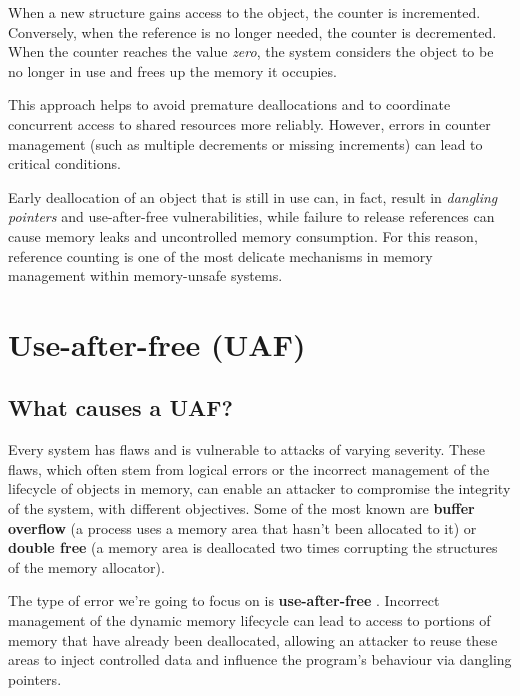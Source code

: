 \noindent When a new structure gains access to the object, the counter is incremented. Conversely, when the reference is no longer needed, the counter is decremented. When the counter reaches the value \textit{zero}, the system considers the object to be no longer in use and frees up the memory it occupies.

This approach helps to avoid premature deallocations and to coordinate concurrent access to shared resources more reliably. However, errors in counter management (such as multiple decrements or missing increments) can lead to critical conditions.

Early deallocation of an object that is still in use can, in fact, result in \textit{dangling pointers} and use-after-free vulnerabilities, while failure to release references can cause memory leaks and uncontrolled memory consumption. For this reason, reference counting is one of the most delicate mechanisms in memory management within memory-unsafe systems.

\section{Use-after-free (UAF)}

\subsection{What causes a UAF?}\label{sec:what-causes-uaf}
Every system has flaws and is vulnerable to attacks of varying severity. These flaws, which often stem from logical errors or the incorrect management of the lifecycle of objects in memory, can enable an attacker to compromise the integrity of the system, with different objectives. Some of the most known are \textbf{buffer overflow} \cite{bib:bof-smashing-stack} (a process uses a memory area that hasn't been allocated to it) or \textbf{double free} \cite{bib:double-free} (a memory area is deallocated two times corrupting the structures of the memory allocator).

The type of error we're going to focus on is \textbf{use-after-free} \cite{bib:use-after-free}. Incorrect management of the dynamic memory lifecycle can lead to access to portions of memory that have already been deallocated, allowing an attacker to reuse these areas to inject controlled data and influence the program's behaviour via dangling pointers.

\begin{listing}[H]
\end{listing}


